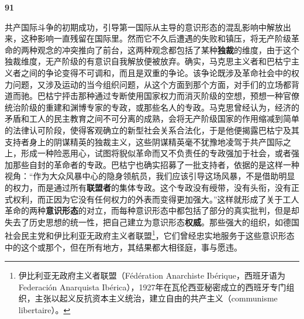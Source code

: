 \documentclass[fontset=fandol, a4paper, 12pt, openright]{ctexbook}
\makeatletter
\newcommand{\thesis}[1]{%
    \par\vspace{1.5em}%
    {\centering \textbf{\Large #1}\par}%
    \nobreak\vspace{0.5em}\nobreak
    \@afterindenttrue %
    \@afterheading    %
}
\makeatother
\begin{document}
\thesis{91}
共产国际斗争的初期成功，引导第一国际从主导的意识形态的混乱影响中解放出来，这种影响一直残留在国际里。然而它不久后遭遇的失败和镇压，将无产阶级革命的两种观念的冲突推向了前台，这两种观念都包括了某种\textbf{独裁}的维度，由于这个独裁维度，无产阶级的有意识自我解放便被放弃。确实，马克思主义者和巴枯宁主义者之间的争论变得不可调和，而且是双重的争论。该争论既涉及革命社会中的权力问题，又涉及运动的当今组织问题，从这个方面到那个方面，对手们的立场都背道而驰。巴枯宁抨击那种通过专断使用国家权力而消灭阶级的空想，预想一种官僚统治阶级的重建和渊博专家的专政，或那些名人的专政。马克思曾经认为，经济的矛盾和工人的民主教育之间不可分离的成熟，会将无产阶级国家的作用缩减到简单的法律认可阶段，使得客观确立的新型社会关系合法化，于是他便揭露巴枯宁及其支持者身上的阴谋精英的独裁主义，这些阴谋精英毫不犹豫地凌驾于共产国际之上，形成一种险恶用心，试图将貎似革命而又不负责任的专政强加于社会，或者强加那些自封的革命者的专政。巴枯宁也确实招募了一批支持者，依据的是这样一种视角：“作为大众风暴中心的隐身领航员，我们应该引导这场风暴，不是借助明显的权力，而是通过所有\textbf{联盟者}的集体专政。这个专政没有绶带，没有头衔，没有正式权利，而正因为它没有任何权力的外表而变得更加强大。”这样就形成了关于工人革命的两种\textbf{意识形态}的对立，而每种意识形态中都包括了部分的真实批判，但是却失去了历史思想的统一性，把自己建立为意识形态\textbf{权威}。那些强大的组织，如德国社会民主党和伊比利亚无政府主义者联盟\footnote{伊比利亚无政府主义者联盟（Fédération Anarchiste Ibérique，西班牙语为Federación Anarquista Ibérica），1927年在瓦伦西亚秘密成立的西班牙专门组织，主张以起义反抗资本主义统治，建立自由的共产主义（communisme libertaire）。}，它们曾经忠实地服务于这些意识形态中的这个或那个，但在所有地方，其结果都大相径庭，事与愿违。
\end{document}
